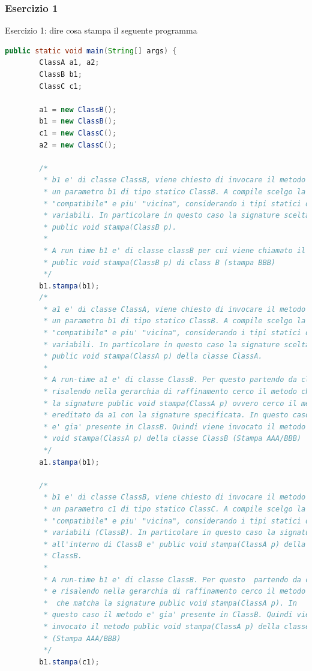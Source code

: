 \documentclass{article}
\begin{document}
\subsubsection{Esercizio 1}
\begin{framed}
Esercizio 1: dire cosa stampa il seguente programma 
\end{framed}
\begin{lstlisting}[language=Java,escapechar=|]
public static void main(String[] args) {
		ClassA a1, a2;
		ClassB b1;
		ClassC c1;

		a1 = new ClassB();
		b1 = new ClassB();
		c1 = new ClassC();
		a2 = new ClassC();

		/*
		 * b1 e' di classe ClassB, viene chiesto di invocare il metodo stampa su
		 * un parametro b1 di tipo statico ClassB. A compile scelgo la signature
		 * "compatibile" e piu' "vicina", considerando i tipi statici delle
		 * variabili. In particolare in questo caso la signature scelta e'
		 * public void stampa(ClassB p).
		 * 
		 * A run time b1 e' di classe classB per cui viene chiamato il metodo
		 * public void stampa(ClassB p) di class B (stampa BBB)
		 */
		b1.stampa(b1);
		/*
		 * a1 e' di classe ClassA, viene chiesto di invocare il metodo stampa su
		 * un parametro b1 di tipo statico ClassB. A compile scelgo la signature
		 * "compatibile" e piu' "vicina", considerando i tipi statici delle
		 * variabili. In particolare in questo caso la signature scelta e'
		 * public void stampa(ClassA p) della classe ClassA.
		 * 
		 * A run-time a1 e' di classe ClassB. Per questo partendo da classB e
		 * risalendo nella gerarchia di raffinamento cerco il metodo che matchi
		 * la signature public void stampa(ClassA p) ovvero cerco il metodo
		 * ereditato da a1 con la signature specificata. In questo caso il metodo
		 * e' gia' presente in ClassB. Quindi viene invocato il metodo public
		 * void stampa(ClassA p) della classe ClassB (Stampa AAA/BBB)
		 */
		a1.stampa(b1);

		/*
		 * b1 e' di classe ClassB, viene chiesto di invocare il metodo stampa su
		 * un parametro c1 di tipo statico ClassC. A compile scelgo la signature
		 * "compatibile" e piu' "vicina", considerando i tipi statici delle
		 * variabili (ClassB). In particolare in questo caso la signature scelta
		 * all'interno di ClassB e' public void stampa(ClassA p) della classe
		 * ClassB.
		 * 
		 * A run-time b1 e' di classe ClassB. Per questo  partendo da classB
		 * e risalendo nella gerarchia di raffinamento cerco il metodo ereditato
		 *  che matcha la signature public void stampa(ClassA p). In
		 * questo caso il metodo e' gia' presente in ClassB. Quindi viene
		 * invocato il metodo public void stampa(ClassA p) della classe ClassB
		 * (Stampa AAA/BBB)
		 */
		b1.stampa(c1);


\end{lstlisting}
\end{document}

